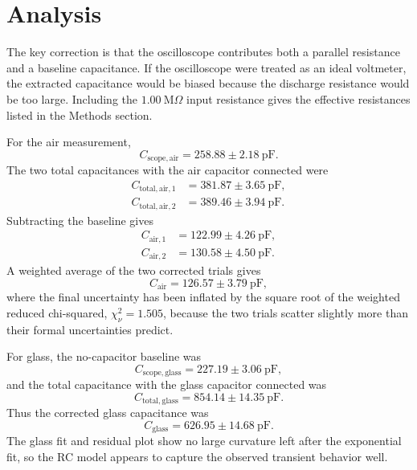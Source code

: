 \documentclass[letterpaper,12pt]{article}
\begin{document}
\section*{Analysis}

The key correction is that the oscilloscope contributes both a parallel resistance and a baseline capacitance. If the oscilloscope were treated as an ideal voltmeter, the extracted capacitance would be biased because the discharge resistance would be too large. Including the $1.00~\mathrm{M}\Omega$ input resistance gives the effective resistances listed in the Methods section.

For the air measurement,
\begin{equation}
    C_{\mathrm{scope,air}} = 258.88 \pm 2.18~\mathrm{pF}.
\end{equation}
The two total capacitances with the air capacitor connected were
\begin{align}
    C_{\mathrm{total,air},1} &= 381.87 \pm 3.65~\mathrm{pF},\\
    C_{\mathrm{total,air},2} &= 389.46 \pm 3.94~\mathrm{pF}.
\end{align}
Subtracting the baseline gives
\begin{align}
    C_{\mathrm{air},1} &= 122.99 \pm 4.26~\mathrm{pF},\\
    C_{\mathrm{air},2} &= 130.58 \pm 4.50~\mathrm{pF}.
\end{align}
A weighted average of the two corrected trials gives
\begin{equation}
    C_{\mathrm{air}} = 126.57 \pm 3.79~\mathrm{pF},
\end{equation}
where the final uncertainty has been inflated by the square root of the weighted reduced chi-squared, $\chi^2_\nu=1.505$, because the two trials scatter slightly more than their formal uncertainties predict.

For glass, the no-capacitor baseline was
\begin{equation}
    C_{\mathrm{scope,glass}} = 227.19 \pm 3.06~\mathrm{pF},
\end{equation}
and the total capacitance with the glass capacitor connected was
\begin{equation}
    C_{\mathrm{total,glass}} = 854.14 \pm 14.35~\mathrm{pF}.
\end{equation}
Thus the corrected glass capacitance was
\begin{equation}
    C_{\mathrm{glass}} = 626.95 \pm 14.68~\mathrm{pF}.
\end{equation}
The glass fit and residual plot show no large curvature left after the exponential fit, so the RC model appears to capture the observed transient behavior well.
\end{document}
